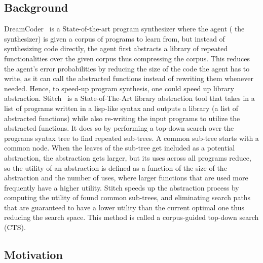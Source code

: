 \subsection{Background}
DreamCoder~\cite{ellis2020dreamcoder} is a State-of-the-art program synthesizer where the agent ( the synthesizer) is given a corpus of programs to learn from, but instead of synthesizing code directly, the agent first abstracts a library of repeated functionalities over the given corpus thus compressing the corpus. This reduces the agent's error probabilities by reducing the size of the code the agent has to write, as it can call the abstracted functions instead of rewriting them whenever needed. Hence, to speed-up program synthesis, one could speed up library abstraction. Stitch~\cite{Bowers_2023stitch} is a State-of-The-Art library abstraction tool that takes in a list of programs written in a lisp-like syntax and outputs a library (a list of abstracted functions) while also re-writing the input programs to utilize the abstracted functions. It does so by performing a top-down search over the programs syntax tree to find repeated sub-trees. A common sub-tree starts with a common node. When the leaves of the sub-tree get included as a potential abstraction, the abstraction gets larger, but its uses across all programs reduce, so the utility of an abstraction is defined as a function of the size of the abstraction and the number of uses, where larger functions that are used more frequently have a higher utility. Stitch speeds up the abstraction process by computing the utility of found common sub-trees, and eliminating search paths that are guaranteed to have a lower utility than the current optimal one thus reducing the search space. This method is called a corpus-guided top-down search (CTS). 

\subsection{Motivation} %

